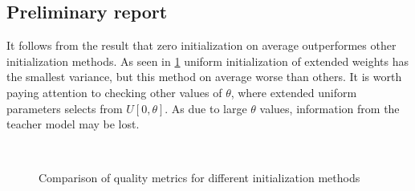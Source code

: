 \documentclass[80pt]{article}
\begin{document}
\subsection{Preliminary report}

It follows from the result that zero initialization on average outperformes other initialization methods. As seen in \ref{fig:1} uniform initialization of extended weights has the smallest variance, but this method on average worse than others. It is worth paying attention to checking other values of $\theta$, where extended uniform parameters selects from $U[0, \theta]$. As due to large $\theta$ values, information from the teacher model may be lost.

\begin{figure}[!t]
  \\
 \caption{Comparison of quality metrics for different initialization methods}
  \label{fig:1}
\end{figure}

\newpage



\end{document}
